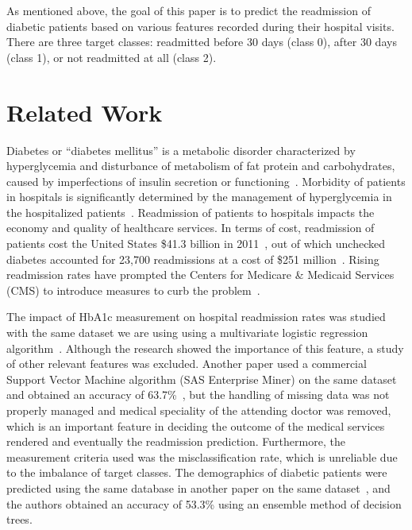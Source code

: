 \documentclass[conference]{IEEEtran}
\begin{document}
As mentioned above, the goal of this paper is to predict the readmission of diabetic patients based on various features recorded during their hospital visits. There are three target classes: readmitted before 30 days (class 0), after 30 days (class 1), or not readmitted at all (class 2).

\section{Related Work}

Diabetes or “diabetes mellitus” is a metabolic disorder characterized by hyperglycemia and disturbance of metabolism of fat protein and carbohydrates, caused by imperfections of insulin secretion or functioning~\cite{worldhealthorganization-2015}. Morbidity of patients in hospitals is significantly determined by the management of hyperglycemia in the hospitalized patients~\cite{hyperglycemia-2002, unrecognizeddiabetes-1998}. Readmission of patients to hospitals impacts the economy and quality of healthcare services. In terms of cost, readmission of patients cost the United States \$41.3 billion in 2011~\cite{estimates-2011}, out of which unchecked diabetes accounted for 23,700 readmissions at a cost of \$251 million~\cite{sas-2015}. Rising readmission rates have prompted the Centers for Medicare \& Medicaid Services (CMS) to introduce measures to curb the problem~\cite{readmissionreduction-2015}.

The impact of HbA1c measurement on hospital readmission rates was studied with the same dataset we are using using a multivariate logistic regression algorithm~\cite{hba1c-2014}. Although the research showed the importance of this feature, a study of other relevant features was excluded. Another paper used a commercial Support Vector Machine algorithm (SAS Enterprise Miner) on the same dataset and obtained an accuracy of 63.7\%~\cite{sas-2015}, but the handling of missing data was not properly managed and medical speciality of the attending doctor was removed, which is an important feature in deciding the outcome of the medical services rendered and eventually the readmission prediction. Furthermore, the measurement criteria used was the misclassification rate, which is unreliable due to the imbalance of target classes. The demographics of diabetic patients were predicted using the same database in another paper on the same dataset~\cite{cotha-2015}, and the authors obtained an accuracy of 53.3\% using an ensemble method of decision trees.
\end{document}
